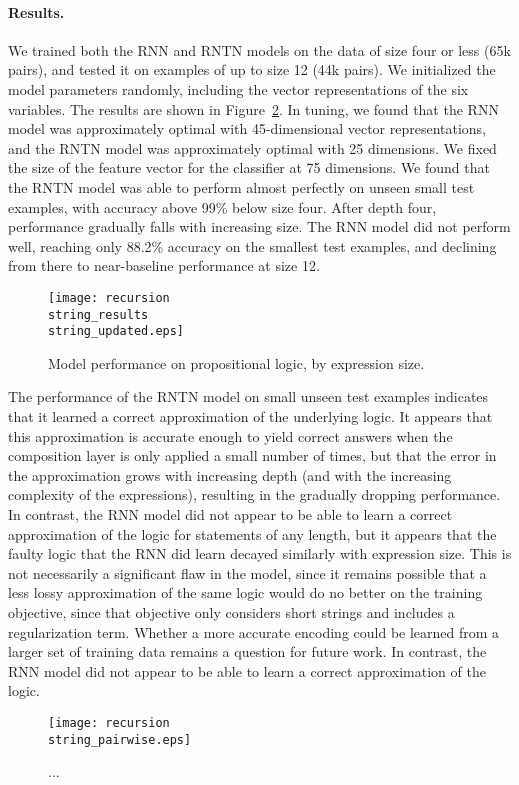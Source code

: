 \paragraph{Results.} We trained both the RNN and RNTN models on the data of size four or
less (65k pairs), and tested it on examples of up to size 12 (44k
pairs). We initialized the model parameters randomly, including the
vector representations of the six variables. The results are shown in
Figure~\ref{prop-results}. In tuning, we found that the RNN model was
approximately optimal with 45-dimensional vector representations, and
the RNTN model was approximately optimal with 25 dimensions. We fixed
the size of the feature vector for the classifier at 75 dimensions. We
found that the RNTN model was able to perform almost perfectly on
unseen small test examples, with accuracy above 99\% below size four.
After depth four, performance gradually falls with increasing size.
The RNN model did not perform well, reaching only 88.2\% accuracy on
the smallest test examples, and declining from there to near-baseline
performance at size 12.

\begin{figure}[htp]
  \centering
  \texttt{[image: recursion\\string\_results\\string\_updated.eps]}
  \caption{Model performance on propositional logic, by expression size.}  
  \label{prop-results}
\end{figure}

The performance of the RNTN model on small unseen test examples
indicates that it learned a correct approximation of the underlying
logic. It appears that this approximation is accurate enough to yield
correct answers when the composition layer is only applied a small
number of times, but that the error in the approximation grows with
increasing depth (and with the increasing complexity of the expressions),
 resulting in the gradually dropping performance. In contrast, the RNN model 
 did not appear to be able to learn a correct approximation of the logic for
 statements of any length, but it appears that the faulty logic that the RNN did
 learn decayed similarly with expression size. 
 This is not necessarily a significant flaw in the model, since it remains possible
that a less lossy approximation of the same logic would do no better
on the training objective, since that objective only considers short
strings and includes a regularization term. Whether a more accurate
encoding could be learned from a larger set of training data remains a
question for future work. In contrast, the RNN model did not appear to
be able to learn a correct approximation of the logic.

\begin{figure}[htp]
  \centering
  \texttt{[image: recursion\\string\_pairwise.eps]}
  \caption{...}  
  \label{prop-results}
\end{figure}



